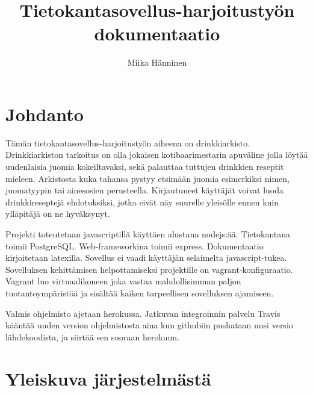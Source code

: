 \documentclass[a4paper]{article}
\title{Tietokantasovellus-harjoitustyön dokumentaatio}
\author{Miika Hänninen}
\begin{document}
\maketitle
\tableofcontents
\pagebreak

\section{Johdanto}
Tämän tietokantasovellus-harjoitustyön aiheena on drinkkiarkisto. Drinkkiarkiston tarkoitus on olla jokaisen kotibaarimestarin apuväline jolla löytää uudenlaisia juomia kokeiltavaksi, sekä palauttaa tuttujen drinkkien reseptit mieleen. Arkistosta kuka tahansa pystyy etsimään juomia esimerkiksi nimen, juomatyypin tai ainesosien perusteella. Kirjautuneet käyttäjät voivat luoda drinkkireseptejä ehdotuksiksi, jotka eivät näy suurelle yleisölle ennen kuin ylläpitäjä on ne hyväksynyt.

Projekti toteutetaan javascriptillä käyttäen alustana nodejs:ää. Tietokantana toimii PostgreSQL. Web-frameworkina toimii express. Dokumentaatio kirjoitetaan latexilla. Sovellus ei vaadi käyttäjän selaimelta javascript-tukea. Sovelluksen kehittämisen helpottamiseksi projektille on vagrant-konfiguraatio. Vagrant luo virtuaalikoneen joka vastaa mahdollisimman paljon tuotantoympäristöä ja sisältää kaiken tarpeellisen sovelluksen ajamiseen. 

Valmis ohjelmisto ajetaan herokussa. Jatkuvan integroinnin palvelu Travis kääntää uuden version ohjelmistosta aina kun githubiin pushataan uusi versio lähdekoodista, ja siirtää sen suoraan herokuun.
\pagebreak

\section{Yleiskuva järjestelmästä}
\end{document}
